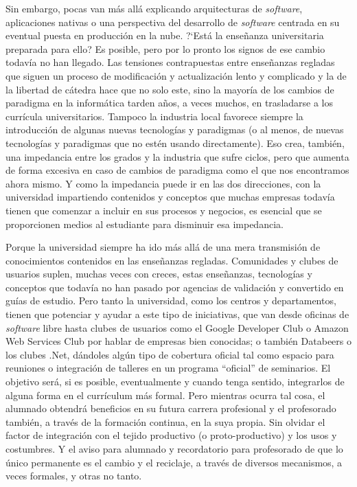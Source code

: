 \documentclass[twoside,10pt]{article}
\begin{document}
\begin{multicols}{2}
Sin embargo, pocas van m\'as all\'a explicando arquitecturas de \textsl{software},
aplicaciones nativas o una perspectiva del desarrollo de \textsl{software} centrada
en su eventual puesta en producci\'on en la nube. ?`Est\'a la ense\~nanza
universitaria preparada para ello? Es posible, pero
por lo pronto los signos de ese cambio todav\'ia no han llegado. Las
tensiones contrapuestas entre ense\~nanzas regladas que siguen un proceso
de modificaci\'on y actualizaci\'on lento y complicado y la de la libertad
de c\'atedra hace que no solo este, sino la mayor\'ia de los cambios de
paradigma en la inform\'atica tarden a\~nos, a veces muchos, en trasladarse
a los curr\'icula
universitarios. 
Tampoco la industria local favorece siempre la introducción de algunas
nuevas tecnologías y paradigmas (o al menos, de nuevas tecnologías y
paradigmas que no estén usando directamente). Eso crea, tambi\'en, una
impedancia entre los grados y
la industria que sufre ciclos, pero que aumenta de forma excesiva en
caso de cambios de paradigma como el que nos encontramos ahora
mismo. Y como la impedancia puede ir en las dos direcciones, con la
universidad impartiendo contenidos y conceptos que muchas empresas
todavía tienen que comenzar a incluir en sus procesos y negocios, es
esencial que se proporcionen medios al estudiante para disminuir esa
impedancia. 

Porque la universidad siempre ha ido m\'as all\'a de una mera
transmisi\'on de conocimientos contenidos en las enseñanzas regladas. Comunidades y clubes de
usuarios suplen, muchas veces con creces, estas ense\~nanzas,
tecnolog\'ias y conceptos que todav\'ia no han pasado por agencias de
validaci\'on y convertido en gu\'ias de estudio. Pero tanto la
universidad, como los centros y  departamentos, tienen que
potenciar y ayudar a este tipo de iniciativas, que van desde oficinas
de \textsl{software} libre hasta clubes de usuarios como el Google Developer
Club o Amazon Web Services Club por hablar de empresas bien conocidas; o
tambi\'en Databeers o los clubes .Net, 
d\'andoles alg\'un tipo de cobertura oficial tal como espacio
para reuniones o integración de talleres en un programa ``oficial'' de
seminarios. 
El objetivo será, si es posible, eventualmente y cuando tenga sentido, integrarlos de
alguna forma en el curr\'iculum m\'as formal. Pero mientras ocurra tal
cosa, el alumnado obtendr\'a
beneficios en su
futura carrera profesional y el profesorado tambi\'en, a trav\'es de la
formaci\'on continua, en la suya propia. 
Sin olvidar el factor de integraci\'on con el tejido productivo (o
proto-productivo) y los usos y costumbres. Y el aviso para alumnado y
recordatorio para profesorado de que lo \'unico
permanente es el cambio y el reciclaje, a trav\'es de diversos mecanismos,
a veces formales, y otras no tanto.



\end{multicols}
\end{document}
